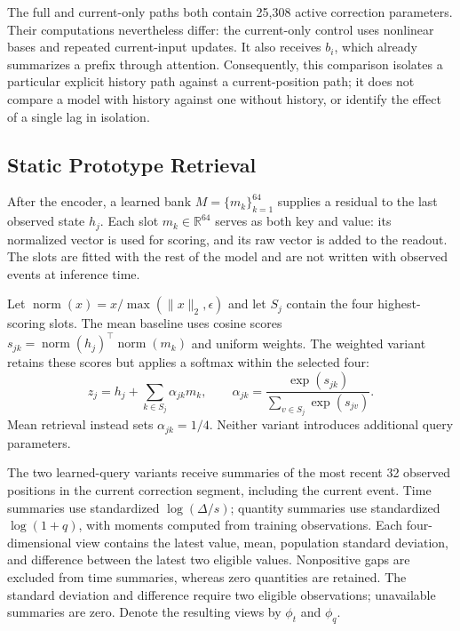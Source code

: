 \documentclass[runningheads]{llncs}
\newcommand{\Nrm}{\operatorname{norm}}
\begin{document}
The full and current-only paths both contain 25,308 active correction parameters. Their computations nevertheless differ: the current-only control uses nonlinear bases and repeated current-input updates. It also receives $b_i$, which already summarizes a prefix through attention. Consequently, this comparison isolates a particular explicit history path against a current-position path; it does not compare a model with history against one without history, or identify the effect of a single lag in isolation.

\subsection{Static Prototype Retrieval}
After the encoder, a learned bank $M=\{m_k\}_{k=1}^{64}$ supplies a residual to the last observed state $h_j$. Each slot $m_k\in\mathbb{R}^{64}$ serves as both key and value: its normalized vector is used for scoring, and its raw vector is added to the readout. The slots are fitted with the rest of the model and are not written with observed events at inference time.

Let $\Nrm(x)=x/\max(\|x\|_2,\epsilon)$ and let $S_j$ contain the four highest-scoring slots. The mean baseline uses cosine scores $s_{jk}=\Nrm(h_j)^\top\Nrm(m_k)$ and uniform weights. The weighted variant retains these scores but applies a softmax within the selected four:
\begin{equation}
 z_j=h_j+\sum_{k\in S_j}\alpha_{jk}m_k,\qquad
 \alpha_{jk}=\frac{\exp(s_{jk})}{\sum_{v\in S_j}\exp(s_{jv})}.
 \label{eq:readout}
\end{equation}
Mean retrieval instead sets $\alpha_{jk}=1/4$. Neither variant introduces additional query parameters.

The two learned-query variants receive summaries of the most recent 32 observed positions in the current correction segment, including the current event. Time summaries use standardized $\log(\Delta/s)$; quantity summaries use standardized $\log(1+q)$, with moments computed from training observations. Each four-dimensional view contains the latest value, mean, population standard deviation, and difference between the latest two eligible values. Nonpositive gaps are excluded from time summaries, whereas zero quantities are retained. The standard deviation and difference require two eligible observations; unavailable summaries are zero. Denote the resulting views by $\phi_t$ and $\phi_q$.
\end{document}

